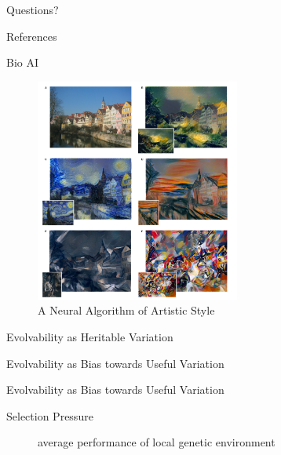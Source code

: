 
\begin{frame}[standout]
  Questions?
\end{frame}

\begin{frame}[allowframebreaks]{References}

  
  
\end{frame}

\begin{frame}{Bio AI}
\begin{figure}
  \includegraphics[width=0.6\textwidth]{img/nn_art_styles.png}
  \captionsetup{singlelinecheck=off,justification=raggedright}
  \caption{A Neural Algorithm of Artistic Style \cite{Gatys2015AStyle}}
\end{figure}
\end{frame}

\begin{frame}{Evolvability as Heritable Variation}
  
\end{frame}

\begin{frame}{Evolvability as Bias towards Useful Variation}
  
\end{frame}

\begin{frame}{Evolvability as Bias towards Useful Variation}
  
\end{frame}

\begin{frame}{Selection Pressure}
\begin{figure}
\resizebox{\textwidth}{!}{%
	
}
\captionsetup{singlelinecheck=off,justification=raggedright}
\caption{average performance of local genetic environment \cite{Reisinger2005TowardsEvolvability}}
\end{figure}
\end{frame}

